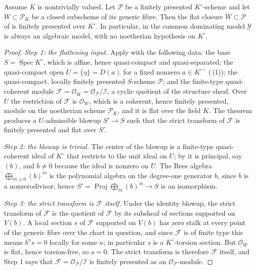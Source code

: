 \begin{proposition}
\label{prop:flat-closure-finite-presentation}
Assume $K$ is nontrivially valued.  Let $\mathcal P$ be a finitely
presented $K^\circ$-scheme and let $W\subset\mathcal P_K$ be a closed
subscheme of its generic fibre.  Then the flat closure
$\overline W\subset\mathcal P$ of  is
finitely presented over $K^\circ$.  In particular, in
 the common dominating model $\mathcal Y$ is
always an algebraic model, with no noetherian hypothesis on $K^\circ$.
\end{proposition}
\begin{proof}
\emph{Step 1: the flattening input.}  Apply
\cite[Tag 0815]{stacks-project} with the following data: the base
$S=\operatorname{Spec}K^\circ$, which is affine, hence quasi-compact and
quasi-separated; the quasi-compact open $U=\{\eta\}=D(a)$ for a fixed
nonzero $a\in K^{\circ\circ}$ (\,(1)); the
quasi-compact, locally finitely presented $S$-scheme $\mathcal P$; and the
finite-type quasi-coherent module
$\mathcal F=\mathcal O_{\overline W}=\mathcal O_{\mathcal P}/\mathcal I$,
a cyclic quotient of the structure sheaf.  Over $U$ the restriction of
$\mathcal F$ is $\mathcal O_W$, which is a coherent, hence finitely
presented, module on the noetherian scheme $\mathcal P_K$, and it is flat
over the field $K$.  The theorem produces a $U$-admissible blowup
$S'\to S$ such that the strict transform of $\mathcal F$ is finitely
presented and flat over $S'$.

\emph{Step 2: the blowup is trivial.}  The center of the blowup is a
finite-type quasi-coherent ideal of $K^\circ$ that restricts to the unit
ideal on $U$; by  it is principal,
say $(b)$, and $b\ne0$ because the ideal is nonzero on $U$.  The Rees
algebra $\bigoplus_{m\geq0}(b)^m$ is the polynomial algebra on the
degree-one generator $b$, since $b$ is a nonzerodivisor; hence
$S'=\operatorname{Proj}\bigoplus_m(b)^m\to S$ is an isomorphism.

\emph{Step 3: the strict transform is $\mathcal F$ itself.}  Under the
identity blowup, the strict transform of $\mathcal F$ is the quotient of
$\mathcal F$ by its subsheaf of sections supported on $V(b)$.  A local
section $s$ of $\mathcal F$ supported on $V(b)$ has zero stalk at every
point of the generic fibre over the chart in question, and since
$\mathcal F$ is of finite type this means $b^ns=0$ locally for some $n$;
in particular $s$ is a $K^\circ$-torsion section.  But
$\mathcal O_{\overline W}$ is flat, hence torsion-free, so $s=0$.  The
strict transform is therefore $\mathcal F$ itself, and Step 1 says that
$\mathcal F=\mathcal O_{\mathcal P}/\mathcal I$ is finitely presented as an
$\mathcal O_{\mathcal P}$-module.


\end{proof}
